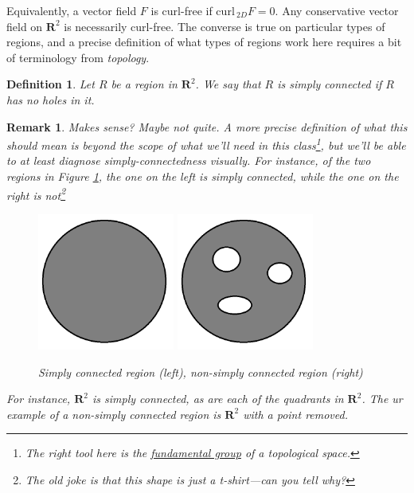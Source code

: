 \documentclass[12pt]{article}
\numberwithin{equation}{subsection}
\numberwithin{figure}{subsection}
\newtheorem{defn}[subsection]{Definition}
\theoremstyle{note}
\newtheorem{remark}[subsection]{Remark}
\newcommand{\curl}{\mathrm{curl\,}}
\begin{document}
{Equivalently, a vector field $F$ is curl-free if $\curl_{2D}F=0$. Any conservative vector field on $\mathbf{R}^2$ is necessarily curl-free. The converse is true on particular types of regions, and a precise definition of what types of regions work here requires a bit of terminology from \textit{topology}. 

\begin{defn}Let $R$ be a region in $\mathbf{R}^2$. We say that $R$ is simply connected if $R$ has no \textit{holes} in it. \end{defn}

\begin{remark} \textit{Makes sense}? Maybe not quite. A more precise definition of what this should mean is beyond the scope of what we'll need in this class\footnote{The right tool here is the \href{https://en.wikipedia.org/wiki/Fundamental_group}{\textit{fundamental group}} of a topological space.}, but we'll be able to at least diagnose simply-connectedness visually. For instance, of the two regions in Figure \ref{fig-simpl}, the one on the left is simply connected, while the one on the right is not\footnote{The old joke is that this shape is just a t-shirt---can you tell why?} 

\begin{figure}[h!]
\centering \includegraphics[width=45mm]{Images/sc} \qquad \qquad \includegraphics[width=45mm]{Images/nsc}
\caption{Simply connected region (left), non-simply connected region (right)}
\label{fig-simpl}
\end{figure}

For instance, $\mathbf{R}^2$ is simply connected, as are each of the quadrants in $\mathbf{R}^2$. The ur example of a non-simply connected region is $\mathbf{R}^2$ with a point removed. 
 \end{remark}

}
\end{document}

